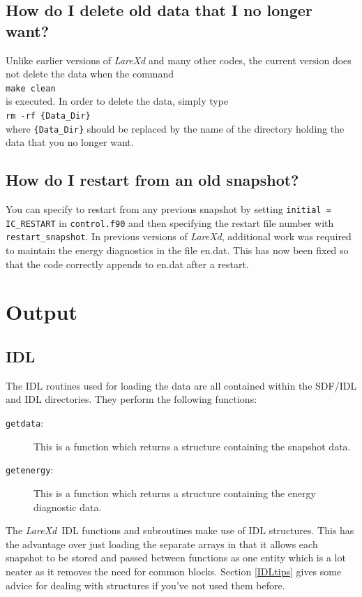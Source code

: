 \documentclass[11pt]{article}
\newcommand{\lare}{{\it LareXd}\ }
\begin{document}
\subsection*{How do I delete old data that I no longer want?}
Unlike earlier versions of {\it LareXd} and many other codes, the current
version does not delete the data when the command\\
\texttt{make clean}\\
is executed. In order to delete the data, simply type\\
\texttt{rm -rf \{Data\_Dir\}}\\
where \texttt{\{Data\_Dir\}} should be replaced by the name of the directory
holding the data that you no longer want.
\subsection*{How do I restart from an old snapshot?}
You can specify to restart from any previous snapshot by setting \texttt{initial = IC\_RESTART} in
\texttt{control.f90} and then specifying the restart file number with \texttt{restart\_snapshot}. In previous 
versions of {\it LareXd}, additional work was required to maintain the energy diagnostics in the file en.dat. 
This has now been fixed so that the code correctly appends to en.dat after a restart.


\section{Output}
\subsection{IDL}
The IDL routines used for loading the data are all contained within the SDF/IDL and IDL directories. They perform the following functions:
\begin{description}
\item[\texttt{getdata}:] This is a function which returns a structure containing the snapshot data.
\item[\texttt{getenergy}:]  This is a function which returns a structure containing the energy diagnostic data.
\end{description}

The \lare IDL functions and subroutines make use of IDL structures. This has the advantage over just loading the 
separate arrays in that it allows each snapshot to be stored and passed between functions as one entity which is 
a lot neater as it removes the need for common blocks. Section \ref{IDLtips} gives some advice for dealing with 
structures if you've not used them before.
\end{document}
